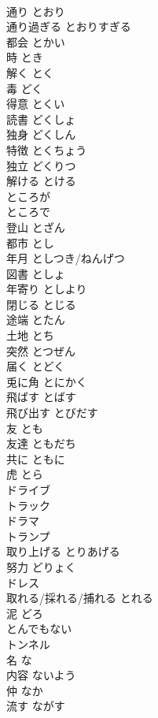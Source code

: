 \documentclass[8pt]{extreport}
\begin{document}
\begin{CJK}{UTF8}{min}
\\	通り	とおり	
\\	通り過ぎる	とおりすぎる	
\\	都会	とかい	
\\	時	とき	
\\	解く	とく	
\\	毒	どく	
\\	得意	とくい	
\\	読書	どくしょ	
\\	独身	どくしん	
\\	特徴	とくちょう	
\\	独立	どくりつ	
\\	解ける	とける	
\\	ところが		
\\	ところで		
\\	登山	とざん	
\\	都市	とし	
\\	年月	としつき/ねんげつ	
\\	図書	としょ	
\\	年寄り	としより	
\\	閉じる	とじる	
\\	途端	とたん	
\\	土地	とち	
\\	突然	とつぜん	
\\	届く	とどく	
\\	兎に角	とにかく	
\\	飛ばす	とばす	
\\	飛び出す	とびだす	
\\	友	とも	
\\	友達	ともだち	
\\	共に	ともに	
\\	虎	とら	
\\	ドライブ		
\\	トラック		
\\	ドラマ		
\\	トランプ		
\\	取り上げる	とりあげる	
\\	努力	どりょく	
\\	ドレス		
\\	取れる/採れる/捕れる	とれる	
\\	泥	どろ	
\\	とんでもない		
\\	トンネル		
\\	名	な	
\\	内容	ないよう	
\\	仲	なか	
\\	流す	ながす	

\end{CJK}
\end{document}
